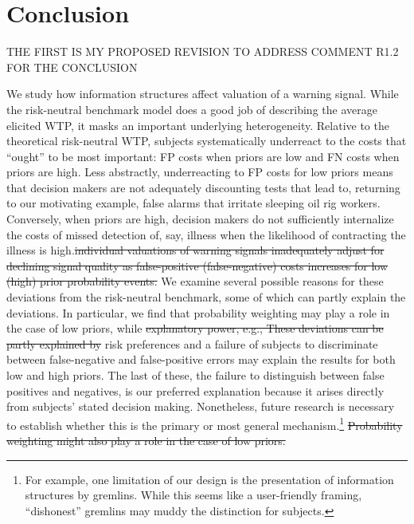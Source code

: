 \documentclass[12pt,a4paper]{article}
\newcommand{\pmt}[1]{{\color{Blue}#1}}
\newcommand{\pmst}[1]{{\color{Blue}\st{#1}}}
\begin{document}
\vspace{10pt}
\section{Conclusion}\label{sec:conclusion}
\pmt{THE FIRST IS MY PROPOSED REVISION TO ADDRESS COMMENT R1.2 FOR THE CONCLUSION}

We study how information structures affect valuation of a warning signal. While the risk-neutral benchmark model does a good job of describing the average elicited WTP, it masks an important underlying heterogeneity.  Relative to the theoretical risk-neutral WTP\pmt{, subjects systematically underreact to the costs that ``ought” to be most important: FP costs when priors are low and FN costs when priors are high.  Less abstractly, underreacting to FP costs for low priors means that decision makers are not adequately discounting tests that lead to, returning to our motivating example, false alarms that irritate sleeping oil rig workers.  Conversely,  when priors are high, decision makers do not sufficiently internalize the costs of missed detection of, say, illness when the likelihood of contracting the illness is high.}\pmst{individual valuations of warning signals inadequately adjust for declining signal quality as false-positive (false-negative) costs increases for low (high) prior probability events.} \pmt{We examine several possible reasons for these deviations from the risk-neutral benchmark,  some of which can partly explain the deviations.  In particular, we find that probability weighting may play a role in the case of low priors, while \pmst{explanatory power, e.g., These deviations can be partly explained by} risk preferences and a failure of subjects to discriminate between false-negative and false-positive errors may explain the results for both low and high priors.  The last of these, the failure to distinguish between false positives and negatives, is our preferred explanation because it arises directly from subjects’ stated decision making.  Nonetheless, future research is necessary to establish whether this is the primary or most general mechanism.\footnote{For example, one limitation of our design is the presentation of information structures by gremlins.  While this seems like a user-friendly framing, ``dishonest” gremlins may muddy the distinction for subjects.}} \pmst{Probability weighting might also play a role in the case of low priors.}
\end{document}

